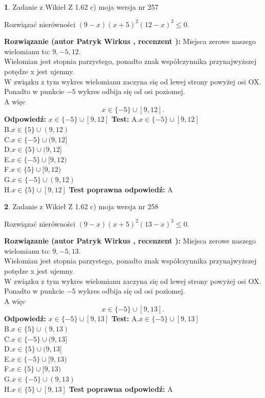 \documentclass[12pt, a4paper]{article}
\theoremstyle{definition} %
\newtheorem{zad}{}
\newcommand{\zadStart}[1]{\begin{zad}#1\newline}
\newcommand{\zadStop}{\end{zad}}
\newcommand{\rozwStart}[2]{\noindent \textbf{Rozwiązanie (autor #1 , recenzent #2): }\newline}
\newcommand{\rozwStop}{\newline}
\newcommand{\odpStart}{\noindent \textbf{Odpowiedź:}\newline}
\newcommand{\odpStop}{\newline}
\newcommand{\testStart}{\noindent \textbf{Test:}\newline}
\newcommand{\testStop}{\newline}
\newcommand{\kluczStart}{\noindent \textbf{Test poprawna odpowiedź:}\newline}
\newcommand{\kluczStop}{\newline}
\begin{document}
\zadStart{Zadanie z Wikieł Z 1.62 c) moja wersja nr 257}

Rozwiązać nierówności $(9-x)(x+5)^{2}(12-x)^{3}\le0$.
\zadStop
\rozwStart{Patryk Wirkus}{}
Miejsca zerowe naszego wielomianu to: $9, -5, 12$.\\
Wielomian jest stopnia parzystego, ponadto znak współczynnika przy\linebreak najwyższej potędze x jest ujemny.\\ W związku z tym wykres wielomianu zaczyna się od lewej strony powyżej osi OX.\\
Ponadto w punkcie $-5$ wykres odbija się od osi poziomej.\\
A więc $$x \in \{-5\} \cup [9,12].$$
\rozwStop
\odpStart
$x \in \{-5\} \cup [9,12]$
\odpStop
\testStart
A.$x \in \{-5\} \cup [9,12]$\\
B.$x \in \{5\} \cup (9,12)$\\
C.$x \in \{-5\} \cup (9,12]$\\
D.$x \in \{5\} \cup (9,12]$\\
E.$x \in \{-5\} \cup [9,12)$\\
F.$x \in \{5\} \cup [9,12)$\\
G.$x \in \{-5\} \cup (9,12)$\\
H.$x \in \{5\} \cup [9,12]$
\testStop
\kluczStart
A
\kluczStop



\zadStart{Zadanie z Wikieł Z 1.62 c) moja wersja nr 258}

Rozwiązać nierówności $(9-x)(x+5)^{2}(13-x)^{3}\le0$.
\zadStop
\rozwStart{Patryk Wirkus}{}
Miejsca zerowe naszego wielomianu to: $9, -5, 13$.\\
Wielomian jest stopnia parzystego, ponadto znak współczynnika przy\linebreak najwyższej potędze x jest ujemny.\\ W związku z tym wykres wielomianu zaczyna się od lewej strony powyżej osi OX.\\
Ponadto w punkcie $-5$ wykres odbija się od osi poziomej.\\
A więc $$x \in \{-5\} \cup [9,13].$$
\rozwStop
\odpStart
$x \in \{-5\} \cup [9,13]$
\odpStop
\testStart
A.$x \in \{-5\} \cup [9,13]$\\
B.$x \in \{5\} \cup (9,13)$\\
C.$x \in \{-5\} \cup (9,13]$\\
D.$x \in \{5\} \cup (9,13]$\\
E.$x \in \{-5\} \cup [9,13)$\\
F.$x \in \{5\} \cup [9,13)$\\
G.$x \in \{-5\} \cup (9,13)$\\
H.$x \in \{5\} \cup [9,13]$
\testStop
\kluczStart
A
\kluczStop
\end{document}
